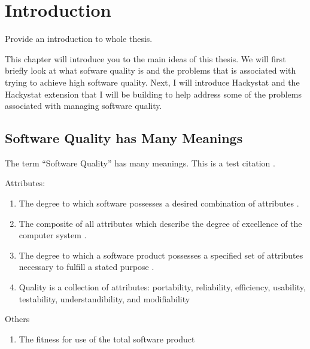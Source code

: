 

\chapter{Introduction}
Provide an introduction to whole thesis.

This chapter will introduce you to the main ideas of this thesis. We will
first briefly look at what sofware quality is and the problems that is
associated with trying to achieve high software quality. Next, I will
introduce Hackystat and the Hackystat extension that I will be building to
help address some of the problems associated with managing software quality.


\section{Software Quality has Many Meanings}

The term ``Software Quality'' has many meanings. This is a test citation \cite{humphrey85}.

\begin{description}
\item Attributes:
\begin{enumerate}
\item The degree to which software possesses a desired combination of attributes
\cite{ieee-glossary83}.
\item The composite of all attributes which describe the degree of
excellence of the computer system \cite{fisher79}.
\item The degree to which a software product possesses a specified set of
attributes necessary to fulfill a stated purpose \cite{reifer85}.
\item Quality is a collection of attributes: portability, reliability,
efficiency, usability, testability, understandibility, and modifiability  \cite{glass79}
\end{enumerate}
\item Others
\begin{enumerate}
\item The fitness for use of the total software product \cite{schulmeyer87}
\end{enumerate}
\end{description}

